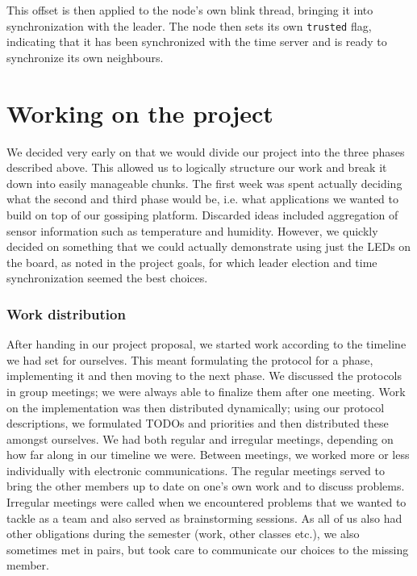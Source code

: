 \documentclass[11pt,
  a4paper,
  ngerman,
  BCOR=7mm
]{scrartcl}
\begin{document}
This offset is then applied to the node's own blink thread, bringing it
into synchronization with the leader. The node then sets its own
\lstinline!trusted! flag, indicating that it has been synchronized with
the time server and is ready to synchronize its own neighbours.

\section*{Working on the project} %
\label{sec:working_on_project}
We decided very early on that we would divide our project into the three
phases described above. This allowed us to logically structure our work
and break it down into easily manageable chunks. The first week was
spent actually deciding what the second and third phase would be, i.e.
what applications we wanted to build on top of our gossiping platform.
Discarded ideas included aggregation of sensor information such as
temperature and humidity. However, we quickly decided on something that
we could actually demonstrate using just the LEDs on the board, as noted
in the project goals, for which leader election and time synchronization
seemed the best choices.

\subsubsection*{Work distribution}
\label{ssub:work_distribution}
After handing in our project proposal, we started work according to the
timeline we had set for ourselves. This meant formulating the protocol
for a phase, implementing it and then moving to the next phase. We
discussed the protocols in group meetings; we were always able to
finalize them after one meeting. Work on the implementation was then
distributed dynamically; using our protocol descriptions, we formulated
TODOs and priorities and then distributed these amongst ourselves. We
had both regular and irregular meetings, depending on how far along in
our timeline we were. Between meetings, we worked more or less
individually with electronic communications. The regular meetings served
to bring the other members up to date on one's own work and to discuss
problems. Irregular meetings were called when we encountered problems
that we wanted to tackle as a team and also served as brainstorming
sessions. As all of us also had other obligations during the semester
(work, other classes etc.), we also sometimes met in pairs, but took
care to communicate our choices to the missing member.
\end{document}
